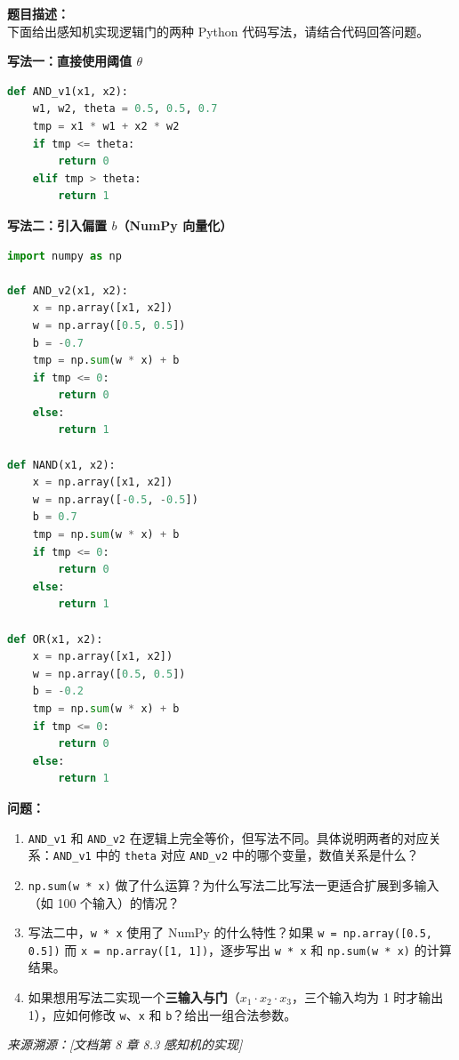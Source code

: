 \documentclass[a4paper,11pt]{ctexart}
\begin{document}
\begin{problembox}
    \textbf{题目描述：}\\
    下面给出感知机实现逻辑门的两种 Python 代码写法，请结合代码回答问题。

    \textbf{写法一：直接使用阈值 $\theta$}
    \begin{lstlisting}[language=Python]
def AND_v1(x1, x2):
    w1, w2, theta = 0.5, 0.5, 0.7
    tmp = x1 * w1 + x2 * w2
    if tmp <= theta:
        return 0
    elif tmp > theta:
        return 1
    \end{lstlisting}

    \textbf{写法二：引入偏置 $b$（NumPy 向量化）}
    \begin{lstlisting}[language=Python]
import numpy as np

def AND_v2(x1, x2):
    x = np.array([x1, x2])
    w = np.array([0.5, 0.5])
    b = -0.7
    tmp = np.sum(w * x) + b
    if tmp <= 0:
        return 0
    else:
        return 1

def NAND(x1, x2):
    x = np.array([x1, x2])
    w = np.array([-0.5, -0.5])
    b = 0.7
    tmp = np.sum(w * x) + b
    if tmp <= 0:
        return 0
    else:
        return 1

def OR(x1, x2):
    x = np.array([x1, x2])
    w = np.array([0.5, 0.5])
    b = -0.2
    tmp = np.sum(w * x) + b
    if tmp <= 0:
        return 0
    else:
        return 1
    \end{lstlisting}

    \vspace{0.2cm}
    \textbf{问题：}
    \begin{enumerate}[(1)]
        \item \texttt{AND\_v1} 和 \texttt{AND\_v2} 在逻辑上完全等价，但写法不同。具体说明两者的对应关系：\texttt{AND\_v1} 中的 \texttt{theta} 对应 \texttt{AND\_v2} 中的哪个变量，数值关系是什么？

        \item \texttt{np.sum(w * x)} 做了什么运算？为什么写法二比写法一更适合扩展到多输入（如 100 个输入）的情况？

        \item 写法二中，\texttt{w * x} 使用了 NumPy 的什么特性？如果 \texttt{w = np.array([0.5, 0.5])} 而 \texttt{x = np.array([1, 1])}，逐步写出 \texttt{w * x} 和 \texttt{np.sum(w * x)} 的计算结果。

        \item 如果想用写法二实现一个\textbf{三输入与门}（$x_1 \cdot x_2 \cdot x_3$，三个输入均为 1 时才输出 1），应如何修改 \texttt{w}、\texttt{x} 和 \texttt{b}？给出一组合法参数。
    \end{enumerate}

    \vspace{0.2cm}
    {\color{gray}\small\textit{来源溯源：[文档第 8 章 8.3 感知机的实现]}}
\end{problembox}
\end{document}
